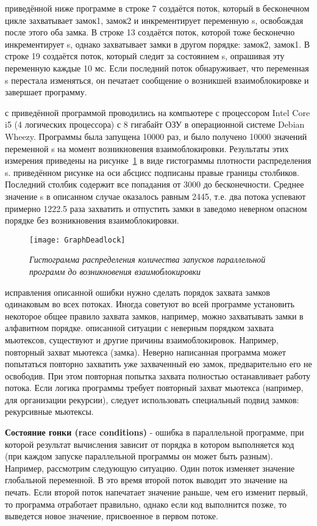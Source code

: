 {	 приведённой ниже программе в строке 7 создаётся поток, который в бесконечном цикле захватывает замок1, замок2 и инкрементирует переменную s, освобождая после этого оба замка. В строке 13 создаётся поток, которой тоже бесконечно инкрементирует s, однако захватывает замки в другом порядке: замок2, замок1. В строке 19 создаётся поток, который следит за состоянием s, опрашивая эту переменную каждые 10 мс. Если последний поток обнаруживает, что переменная s перестала изменяться, он печатает сообщение о возникшей взаимоблокировке и завершает программу.  
	\begin{figure}[H]
		
	\end{figure}
	 с приведённой программой проводились на компьютере с процессором Intel Core i5 (4 логических процессора) с 8 гигабайт ОЗУ в операционной системе Debian Wheezy. Программы была запущена 10000 раз, и было получено 10000 значений переменной s на момент возникновения взаимоблокировки. Результаты этих измерения приведены на рисунке~\ref{GraphDeadlock:image} в виде гистограммы плотности распределения s.
	 приведённом рисунке на оси абсцисс подписаны правые границы столбиков. Последний столбик содержит все попадания от 3000 до бесконечности. Среднее значение s в описанном случае оказалось равным 2445, т.е. два потока успевают примерно 1222.5 раза захватить и отпустить замки в заведомо неверном опасном порядке без возникновения взаимоблокировки.
	\begin{figure}[H]
		\texttt{[image: GraphDeadlock]}
		\caption{\textit{Гистограмма распределения количества запусков параллельной программ до возникновения взаимоблокировки}}
		\label{GraphDeadlock:image}
	\end{figure}
	 исправления описанной ошибки нужно сделать порядок захвата замков одинаковым во всех потоках. Иногда советуют во всей программе установить некоторое общее правило захвата замков, например, можно захватывать замки в алфавитном порядке.
	 описанной ситуации с неверным порядком захвата мьютексов, существуют и другие причины взаимоблокировок. Например, повторный захват мьютекса (замка). Неверно написанная программа может попытаться повторно захватить уже захваченный ею замок, предварительно его не освободив. При этом повторная попытка захвата полностью останавливает работу потока. Если логика программы требует повторный захват мьютекса (например, для организации рекурсии), следует использовать специальный подвид замков: рекурсивные мьютексы.
	\par\textbf{Состояние гонки (race conditions)} - ошибка в параллельной программе, при которой результат вычисления зависит от порядка в котором выполняется код (при каждом запуске параллельной программы он может быть разным). Например, рассмотрим следующую ситуацию. Один поток изменяет значение глобальной переменной. В это время второй поток выводит это значение на печать. Если второй поток напечатает значение раньше, чем его изменит первый, то программа отработает правильно, однако если код выполнится позже, то выведется новое значение, присвоенное в первом потоке.
}
